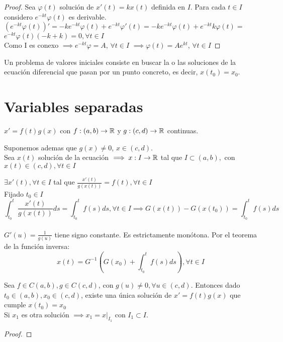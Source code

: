 \begin{proof}
Sea $\varphi(t)$ solución de $x'(t) = kx(t)$ definida en $I$. Para cada $t\in I$ considero $e^{-kt}\varphi (t)$ es derivable.\\
$(e^{-kt}\varphi (t))' = -ke^{-kt}\varphi (t) + e^{-kt}\varphi' (t) = -ke^{-kt}\varphi (t) + e^{-kt}k\varphi (t) =$\\$ e^{-kt}\varphi (t) (-k+k) = 0, \forall t \in I$\\
Como I es conexo $\implies e^{-kt}\varphi = A$, $\forall t \in I$ $\implies \varphi(t)=Ae^{kt}$, $\forall t \in I$
\end{proof}


Un problema de valores iniciales consiste en buscar la o las soluciones de la ecuación diferencial que pasan por un punto concreto, es decir, $x(t_0)=x_0$.

\section{Variables separadas}

$x' = f(t)g(x)$ con $f:(a,b)\to \mathbb{R}$ y $g:(c,d) \to \mathbb{R}$ continuas.

Suponemos ademas que $g(x) \neq 0$, $x\in (c,d)$.\\
Sea $x(t)$ solución de la ecuación $\implies x:I \to \mathbb{R}$ tal que $I\subset (a,b),$ con $ x(t)\in (c,d), \forall t \in I$

$\exists x'(t), \forall t \in I$ tal que $\frac{x'(t)}{g(x(t))} = f(t), \forall t \in I$\\
Fijado $t_0 \in I$\\
\[\int_{t_0}^{t}\frac{x'(t)}{g(x(t))} ds = \int_{t_0}^{t} f(s) ds, \forall t \in I \implies G(x(t)) - G(x(t_0)) = \int_{t_0}^{t}f(s) ds\] \\
$G'(u) = \frac{1}{g(u)}$ tiene signo constante. Es estrictamente monótona. Por el teorema de la función inversa:
\[x(t) = G^{-1}(G(x_0) + \int_{t_0}^{t}f(s) ds), \forall t \in I\]

\begin{nth}
Sea $f\in C(a,b), g\in C(c,d)$, con $g(u) \neq 0, \forall u \in (c,d)$. Entonces dado $t_0 \in (a,b), x_0 \in (c,d)$, existe una única solución de $x' = f(t)g(x)$ que cumple $x(t_0) = x_0$\\
Si $x_1$ es otra solución $\implies x_1 = x|_{I_1}$ con $I_1\subset I$.

\end{nth}

\begin{proof}



\end{proof}
